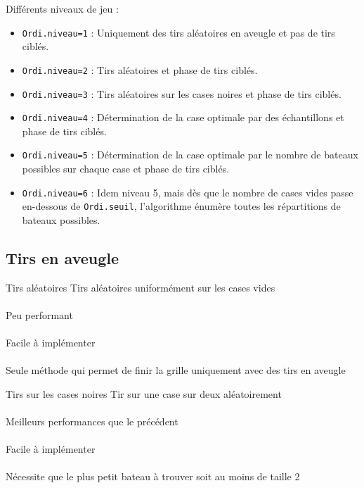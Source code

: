 \begin{frame}
Différents niveaux de jeu :
\begin{itemize}
\item<1> \texttt{Ordi.niveau=1} : Uniquement des tirs aléatoires en aveugle et pas de tirs ciblés.
\item<2> \texttt{Ordi.niveau=2} : Tirs aléatoires et phase de tirs ciblés.
\item<3> \texttt{Ordi.niveau=3} : Tirs aléatoires sur les cases noires  et phase de tirs ciblés.
\item<4> \texttt{Ordi.niveau=4} : Détermination de la case optimale par des échantillons et phase de tirs ciblés.
\item<5> \texttt{Ordi.niveau=5} : Détermination de la case optimale par le nombre de bateaux possibles sur chaque case et phase de tirs ciblés.
\item<6> \texttt{Ordi.niveau=6} : Idem niveau 5, mais dès que le nombre de cases vides passe en-dessous de \texttt{Ordi.seuil}, l'algorithme énumère toutes les répartitions de bateaux possibles.
\end{itemize}
\end{frame}

\subsection{Tirs en aveugle}
\begin{frame}{Tirs aléatoires}
Tirs aléatoires uniformément sur les cases vides\\~\\  \pause
Peu performant\\~\\ \pause
Facile à implémenter\\~\\ \pause
Seule méthode qui permet de finir la grille uniquement avec des tirs en aveugle
\end{frame}


\begin{frame}{Tirs sur les cases noires}
Tir sur une case sur deux aléatoirement\\~\\ \pause
Meilleurs performances que le précédent\\~\\ \pause
Facile à implémenter\\~\\ \pause
Nécessite que le plus petit bateau à trouver soit au moins de taille 2
\end{frame}


